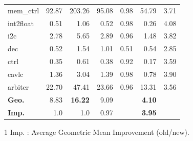 \documentclass[conference]{IEEEtran}
\begin{document}
\begin{table}[h]
\begin{tabular*}{\hsize}{@{}@{\extracolsep{\fill}}lrrrrrr@{}}
    mem\_ctrl  & 92.87  & 203.26  & 95.08  & 0.98  & 54.79  & 3.71   \\ 
    int2float  & 0.51  & 1.06  & 0.52  & 0.98  & 0.26  & 4.08   \\ 
    i2c        & 2.78  & 5.65  & 2.89  & 0.96  & 1.48  & 3.82   \\ 
    dec        & 0.52  & 1.54  & 1.01  & 0.51  & 0.54  & 2.85   \\ 
    ctrl       & 0.35  & 0.61  & 0.38  & 0.92  & 0.17  & 3.59   \\ 
    cavlc      & 1.36  & 3.04  & 1.39  & 0.98  & 0.78  & 3.90   \\ 
    arbiter    & 22.70  & 47.41  & 23.66  & 0.96  & 13.31  & 3.56   \\ 
  \midrule
  {\bf Geo.}&8.83  &{\bf 16.22}   &9.09  &     &{\bf 4.10}  &      \\ 
  {\bf Imp.}   &1.0   &1.0    &0.97  &     &{\bf 3.95}&   \\ 
  \bottomrule
	\end{tabular*}
  \begin{tablenotes}
    \footnotesize
    \item[1] Imp. : Average Geometric Mean Improvement (old/new).
  \end{tablenotes}
\end{table}
\end{document}
